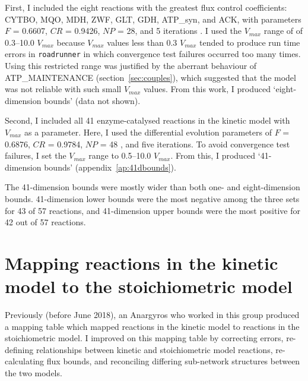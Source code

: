 \documentclass[parskip=full, numbers=noenddot]{scrreprt}
\begin{document}
First, I included the eight reactions with the greatest flux control coefficients: CYTBO, MQO, MDH, ZWF, GLT, GDH, ATP\_syn, and ACK, with parameters $F$ = 0.6607, $CR$ = 0.9426, $NP$ = 28, and 5 iterations \citep{pedersen_good_2010}. I used the $V_{max}$ range of of 0.3--10.0 $V_{max}$ because $V_{max}$ values less than 0.3 $V_{max}$ tended to produce run time errors in \texttt{roadrunner} in which convergence test failures occurred too many times. Using this restricted range was justified by the aberrant behaviour of ATP\_MAINTENANCE (section~\ref{sec:couples}), which suggested that the model was not reliable with such small $V_{max}$ values. From this work, I produced `eight-dimension bounds' (data not shown).

Second, I included all 41 enzyme-catalysed reactions in the kinetic model with $V_{max}$ as a parameter. Here, I used the differential evolution parameters of $F$ = 0.6876, $CR$ = 0.9784, $NP$ = 48 \citep{pedersen_good_2010}, and five iterations. To avoid convergence test failures, I set the $V_{max}$ range to 0.5--10.0 $V_{max}$. From this, I produced `41-dimension bounds' (appendix~\ref{ap:41dbounds}).

The 41-dimension bounds were mostly wider than both one- and eight-dimension bounds. 41-dimension lower bounds were the most negative among the three sets for 43 of 57 reactions, and 41-dimension upper bounds were the most positive for 42 out of 57 reactions.

\section{Mapping reactions in the kinetic model to the stoichiometric model}
\label{sec:mapping}

Previously (before June 2018), an Anargyros who worked in this group produced a mapping table which mapped reactions in the kinetic model to reactions in the stoichiometric model. %
I improved on this mapping table by correcting errors, re-defining relationships between kinetic and stoichiometric model reactions, re-calculating flux bounds, and reconciling differing sub-network structures between the two models.
\end{document}
